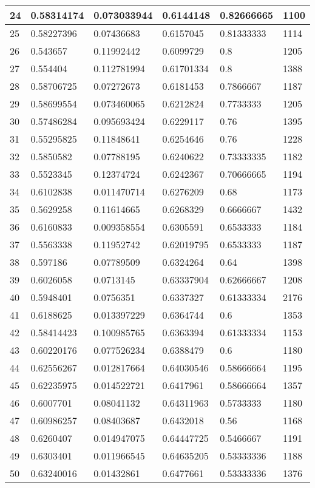 \begin{longtable}{|l|l|l|l|l|l|}
24 & 0.58314174 & 0.073033944 & 0.6144148 & 0.82666665 & 1100 \\ \hline 
25 & 0.58227396 & 0.07436683 & 0.6157045 & 0.81333333 & 1114 \\ \hline 
26 & 0.543657 & 0.11992442 & 0.6099729 & 0.8 & 1205 \\ \hline 
27 & 0.554404 & 0.112781994 & 0.61701334 & 0.8 & 1388 \\ \hline 
28 & 0.58706725 & 0.07272673 & 0.6181453 & 0.7866667 & 1187 \\ \hline 
29 & 0.58699554 & 0.073460065 & 0.6212824 & 0.7733333 & 1205 \\ \hline 
30 & 0.57486284 & 0.095693424 & 0.6229117 & 0.76 & 1395 \\ \hline 
31 & 0.55295825 & 0.11848641 & 0.6254646 & 0.76 & 1228 \\ \hline 
32 & 0.5850582 & 0.07788195 & 0.6240622 & 0.73333335 & 1182 \\ \hline 
33 & 0.5523345 & 0.12374724 & 0.6242367 & 0.70666665 & 1194 \\ \hline 
34 & 0.6102838 & 0.011470714 & 0.6276209 & 0.68 & 1173 \\ \hline 
35 & 0.5629258 & 0.11614665 & 0.6268329 & 0.6666667 & 1432 \\ \hline 
36 & 0.6160833 & 0.009358554 & 0.6305591 & 0.6533333 & 1184 \\ \hline 
37 & 0.5563338 & 0.11952742 & 0.62019795 & 0.6533333 & 1187 \\ \hline 
38 & 0.597186 & 0.07789509 & 0.6324264 & 0.64 & 1398 \\ \hline 
39 & 0.6026058 & 0.0713145 & 0.63337904 & 0.62666667 & 1208 \\ \hline 
40 & 0.5948401 & 0.0756351 & 0.6337327 & 0.61333334 & 2176 \\ \hline 
41 & 0.6188625 & 0.013397229 & 0.6364744 & 0.6 & 1353 \\ \hline 
42 & 0.58414423 & 0.100985765 & 0.6363394 & 0.61333334 & 1153 \\ \hline 
43 & 0.60220176 & 0.077526234 & 0.6388479 & 0.6 & 1180 \\ \hline 
44 & 0.62556267 & 0.012817664 & 0.64030546 & 0.58666664 & 1195 \\ \hline 
45 & 0.62235975 & 0.014522721 & 0.6417961 & 0.58666664 & 1357 \\ \hline 
46 & 0.6007701 & 0.08041132 & 0.64311963 & 0.5733333 & 1180 \\ \hline 
47 & 0.60986257 & 0.08403687 & 0.6432018 & 0.56 & 1168 \\ \hline 
48 & 0.6260407 & 0.014947075 & 0.64447725 & 0.5466667 & 1191 \\ \hline 
49 & 0.6303401 & 0.011966545 & 0.64635205 & 0.53333336 & 1188 \\ \hline 
50 & 0.63240016 & 0.01432861 & 0.6477661 & 0.53333336 & 1376 \\ \hline 
\end{longtable}
